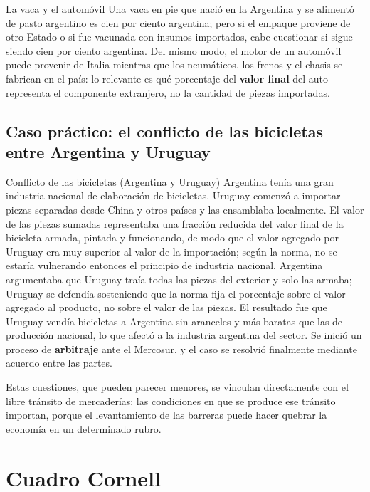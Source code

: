 \documentclass[12pt,oneside]{book}
\begin{document}
\begin{ejemplo}{La vaca y el automóvil}
Una vaca en pie que nació en la Argentina y se alimentó de pasto argentino es cien por ciento argentina; pero si el empaque proviene de otro Estado o si fue vacunada con insumos importados, cabe cuestionar si sigue siendo cien por ciento argentina. Del mismo modo, el motor de un automóvil puede provenir de Italia mientras que los neumáticos, los frenos y el chasis se fabrican en el país: lo relevante es qué porcentaje del \textbf{valor final} del auto representa el componente extranjero, no la cantidad de piezas importadas.
\end{ejemplo}

\subsection{Caso práctico: el conflicto de las bicicletas entre Argentina y Uruguay}

\begin{ejemplo}{Conflicto de las bicicletas (Argentina y Uruguay)}
Argentina tenía una gran industria nacional de elaboración de bicicletas. Uruguay comenzó a importar piezas separadas desde China y otros países y las ensamblaba localmente. El valor de las piezas sumadas representaba una fracción reducida del valor final de la bicicleta armada, pintada y funcionando, de modo que el valor agregado por Uruguay era muy superior al valor de la importación; según la norma, no se estaría vulnerando entonces el principio de industria nacional. Argentina argumentaba que Uruguay traía todas las piezas del exterior y solo las armaba; Uruguay se defendía sosteniendo que la norma fija el porcentaje sobre el valor agregado al producto, no sobre el valor de las piezas. El resultado fue que Uruguay vendía bicicletas a Argentina sin aranceles y más baratas que las de producción nacional, lo que afectó a la industria argentina del sector. Se inició un proceso de \textbf{arbitraje} ante el Mercosur, y el caso se resolvió finalmente mediante acuerdo entre las partes.
\end{ejemplo}

Estas cuestiones, que pueden parecer menores, se vinculan directamente con el libre tránsito de mercaderías: las condiciones en que se produce ese tránsito importan, porque el levantamiento de las barreras puede hacer quebrar la economía en un determinado rubro.

\section{Cuadro Cornell}
\end{document}

